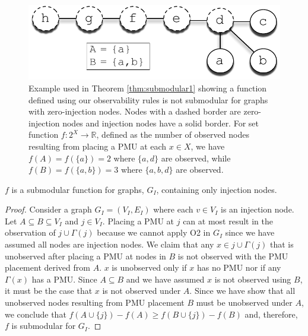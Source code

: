 \begin{figure}[t]
\centering
\includegraphics[scale=.75]{figs/submodular-counterexample.pdf}
\caption{Example used in Theorem \ref{thm:submodular1} showing a function defined using our observability rules is not submodular for graphs with zero-injection nodes.  
Nodes with a dashed border are zero-injection nodes and injection nodes have a solid border. For set function $f: 2^X \rightarrow \mathbb{R}$, defined as the number of observed nodes 
resulting from placing a PMU at each $x \in X$, we have $f(A) = f(\{a\}) = 2$ where $\{a,d\}$ are observed, while $f(B) = f(\{a,b\}) = 3$ where $\{a,b,d\}$ are observed.  }
\label{fig:submodular-counter}
\end{figure}


\begin{theorem}
\label{thm:submodular2}
$f$ is a submodular function for graphs, $G_I$, containing only injection nodes.
\end{theorem}

\begin{proof}
Consider a graph $G_I=(V_I,E_I)$ where each $v \in V_I$ is an injection node. Let $A \subseteq B \subseteq V_I$ and $j \in V_I$.  Placing a PMU at $j$ can at most result in the observation of
$j \cup \Gamma(j)$ because we cannot apply O2 in $G_I$ since we have assumed all nodes are injection nodes.
We claim that any $x \in j \cup \Gamma(j)$ that is unobserved after placing a PMU at nodes in $B$ is not observed with the PMU placement derived from $A$.  $x$ is unobserved only if 
$x$ has no PMU nor if any $\Gamma(x)$ has a PMU.  Since $A \subseteq B$ and we have assumed $x$ is not observed using $B$, it must be the case that $x$ is not observed under $A$.
Since we have show that all unobserved nodes resulting from PMU placement $B$ must be unobserved under $A$, we conclude that $f(A \cup \{j\}) - f(A) \geq f(B \cup \{j\}) - f(B)$ 
and, therefore, $f$ is submodular for $G_I$.
\end{proof}

